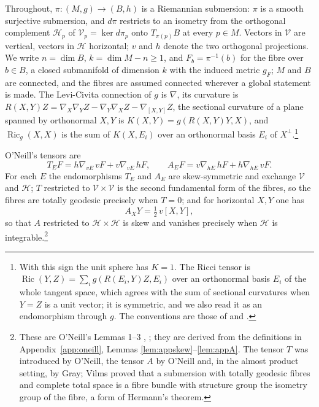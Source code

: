 \documentclass[11pt,reqno]{amsart}
\theoremstyle{plain}
\theoremstyle{definition}
\newcommand{\Ric}{\operatorname{Ric}}
\newcommand{\hor}{\mathcal{H}}
\newcommand{\ver}{\mathcal{V}}
\begin{document}
Throughout, $\pi\colon(M,g)\to(B,h)$ is a Riemannian submersion: $\pi$ is a smooth surjective submersion, and $d\pi$ restricts to an isometry from the orthogonal complement $\hor_p$ of $\ver_p=\ker d\pi_p$ onto $T_{\pi(p)}B$ at every $p\in M$. Vectors in $\ver$ are vertical, vectors in $\hor$ horizontal; $v$ and $h$ denote the two orthogonal projections. We write $n=\dim B$, $k=\dim M-n\ge1$, and $F_b=\pi^{-1}(b)$ for the fibre over $b\in B$, a closed submanifold of dimension $k$ with the induced metric $g_F$; $M$ and $B$ are connected, and the fibres are assumed connected wherever a global statement is made. The Levi-Civita connection of $g$ is $\nabla$, its curvature is $R(X,Y)Z=\nabla_X\nabla_YZ-\nabla_Y\nabla_XZ-\nabla_{[X,Y]}Z$, the sectional curvature of a plane spanned by orthonormal $X,Y$ is $K(X,Y)=g(R(X,Y)Y,X)$, and $\Ric_g(X,X)$ is the sum of $K(X,E_i)$ over an orthonormal basis $E_i$ of $X^\perp$.\footnote{With this sign the unit sphere has $K=1$. The Ricci tensor is $\Ric(Y,Z)=\sum_ig(R(E_i,Y)Z,E_i)$ over an orthonormal basis $E_i$ of the whole tangent space, which agrees with the sum of sectional curvatures when $Y=Z$ is a unit vector; it is symmetric, and we also read it as an endomorphism through $g$. The conventions are those of \cite{KobayashiNomizu1963} and \cite{Petersen2016}.}

O'Neill's tensors \cite{ONeill1966} are
\begin{equation}
T_EF=h\nabla_{vE}\,vF+v\nabla_{vE}\,hF,\qquad A_EF=v\nabla_{hE}\,hF+h\nabla_{hE}\,vF .
\end{equation}
For each $E$ the endomorphisms $T_E$ and $A_E$ are skew-symmetric and exchange $\ver$ and $\hor$; $T$ restricted to $\ver\times\ver$ is the second fundamental form of the fibres, so the fibres are totally geodesic precisely when $T=0$; and for horizontal $X,Y$ one has
\begin{equation}\label{eq:Abracket}
A_XY=\tfrac12\,v[X,Y],
\end{equation}
so that $A$ restricted to $\hor\times\hor$ is skew and vanishes precisely when $\hor$ is integrable.\footnote{These are O'Neill's Lemmas 1--3 \cite{ONeill1966}, \cite[9.21--9.24]{Besse1987}; they are derived from the definitions in Appendix~\ref{app:oneill}, Lemmas \ref{lem:appskew}--\ref{lem:appA}. The tensor $T$ was introduced by O'Neill, the tensor $A$ by O'Neill and, in the almost product setting, by Gray; Vilms \cite{Vilms1970} proved that a submersion with totally geodesic fibres and complete total space is a fibre bundle with structure group the isometry group of the fibre, a form of Hermann's theorem.}
\end{document}

